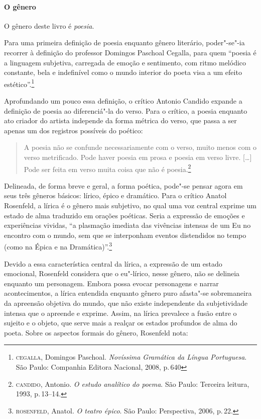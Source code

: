 \documentclass[11pt]{extarticle}
\begin{document}
\paragraph{O gênero} O gênero deste livro é \textit{poesia}. 


Para uma primeira definição de poesia enquanto gênero literário, poder"-se"-ia recorrer à definição do professor Domingos Paschoal Cegalla, para quem ``poesia é a linguagem subjetiva, carregada de emoção e sentimento, com ritmo melódico constante, bela e indefinível como o mundo interior do poeta visa a um efeito estético''.\footnote{\textsc{cegalla}, Domingos Paschoal. \textit{Novíssima Gramática da Língua Portuguesa}. São Paulo: Companhia Editora Nacional, 2008, p.\,640}

Aprofundando um pouco essa definição, o crítico Antonio Candido expande a definição de poesia ao diferenciá"-la do verso.
Para o crítico, a poesia enquanto ato criador do artista independe da forma métrica do verso, que passa a ser apenas um dos registros possíveis do poético:

\begin{quote}
A poesia não se confunde necessariamente com o verso, muito menos com o verso metrificado. Pode haver poesia em prosa e poesia em verso livre. [\ldots]
Pode ser feita em verso muita coisa que não é poesia.\footnote{\textsc{candido}, Antonio. \textit{O estudo analítico do poema}. São Paulo: Terceira leitura, 1993, p.\,13--14.}
\end{quote}

Delineada, de forma breve e geral, a forma poética, pode"-se pensar agora em seus três gêneros básicos: lírico, épico e dramático.
Para o crítico Anatol Rosenfeld, a lírica é o gênero mais subjetivo, no qual uma voz central exprime um estado de alma traduzido em orações poéticas.
Seria a expressão de emoções e experiências vividas, ``a plasmação imediata das vivências intensas de um Eu no encontro com o mundo, sem que se interponham eventos distendidos no tempo (como na Épica e na Dramática)''.\footnote{\textsc{rosenfeld}, Anatol. \textit{O teatro épico}. São Paulo: Perspectiva, 2006, p.\,22.}

Devido a essa característica central da lírica, a expressão de um estado emocional, Rosenfeld considera que o eu"-lírico, nesse gênero, não se delineia enquanto um personagem. Embora possa evocar personagens e narrar acontecimentos, a lírica entendida enquanto gênero puro afasta"-se sobremaneira da apreensão objetiva do mundo, que não existe independente da subjetividade intensa que o apreende e exprime. Assim, na lírica prevalece a fusão entre o sujeito e o objeto, que serve mais a realçar os estados profundos de alma do poeta.
Sobre os aspectos formais do gênero, Rosenfeld nota:
\end{document}
